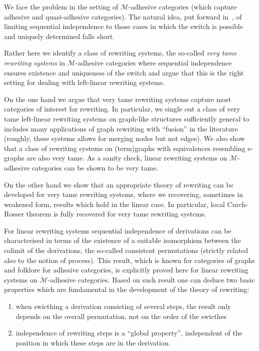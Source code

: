 \documentclass[a4paper,UKenglish,cleveref,pdftex, thm-restate,numberwithinsect]{lipics}
\begin{document}
We face the problem in the setting of $\mathcal{M}$-adhesive
categories (which capture adhesive and quasi-adhesive categories).
The natural idea, put forward in~\cite{baldan2017domains}, of limiting
sequential independence to those cases in which the switch is possible
and uniquely determined falls short.

Rather here we identify a class of rewriting systems, the so-called
\emph{very tame rewriting systems} in $\mathcal{M}$-adhesive
categories where sequential independence ensures existence and
uniqueness of the switch and argue that this is the right setting for
dealing with left-linear rewriting systems.

On the one hand we argue that very tame rewriting systems capture most
categories of interest for rewriting. In particular, we single out a
class of very tame left-linear rewriting systems on graph-like
structures sufficiently general to includes many applications of graph
rewriting with ``fusion'' in the literature (roughly, these systems
allows for merging nodes but not edges).  We also show that a class of
rewriting systems on (term)graphs with equivalences resembling
e-graphs are also very tame. As a sanity check, linear rewriting
systems on $\mathcal{M}$-adhesive categories can be shown to be very
tame.

On the other hand we show that an appropriate theory of rewriting can
be developed for very tame rewriting systems, where we recovering,
sometimes in weakened form, results which hold in the linear case. In
particular, local Curch-Rosser theorem is fully recovered for very
tame rewriting systems.

For linear rewriting systems sequential independence of derivations
can be characterised in terms of the existence of a suitable
isomorphism between the colimit of the derivations, the so-called
consistent permutations (strictly related also to the notion of
process). This result, which is known for categories of graphs and
folklore for adhesive categories, is explicitly proved here for linear
rewriting systems on $\mathcal{M}$-adhesive categories. Based on such
result one can deduce two basic properties which are fundamental in the development of the theory of rewriting:
\begin{enumerate}
\item when swicthing a derivation consisting of several steps, the result only depends on the overall permutation, not on the order of the swicthes
\item independence of rewriting steps is a ``global property'', independent of the position in which these steps are in the derivation.
\end{enumerate}
\end{document}
